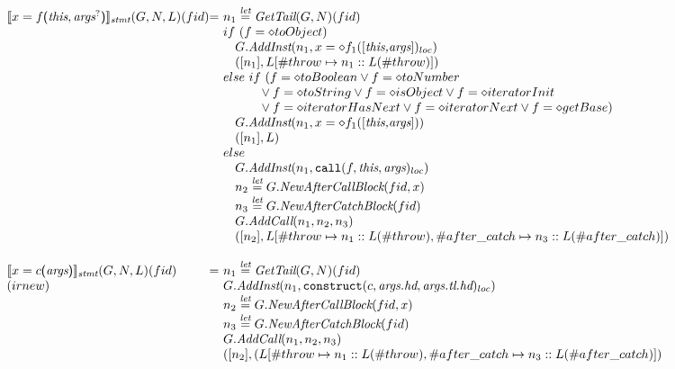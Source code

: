\[
\begin{array}{l@{}l@{~}l}
\transfun{\ircfgcall{x}{f}{\emph{this}, \emph{args}^{?}}}_{\emph{stmt}}(G,N,L)(fid) & = &
	n_1 \letval \GetTail(G,N)(fid)\\
	& & if\ (f = \diamond{toObject}) \\
	& & \phantom{if} G.\emph{AddInst}(n_1,x =\diamond f_1([\emph{this,args}])_{loc})\\
	& & \phantom{if} ([n_1],L[\#throw \mapsto n_{1}::L(\#throw)])\\
	& & else\ if\ (f = \diamond{toBoolean} \vee f = \diamond{toNumber}\\
	& & \phantom{ififif} \vee f = \diamond{toString} \vee f = \diamond{isObject}\vee f = \diamond{iteratorInit}\\
	& & \phantom{ififif} \vee f = \diamond{iteratorHasNext}\vee f = \diamond{iteratorNext}\vee f = \diamond{getBase})\\
	& & \phantom{if} G.\emph{AddInst}(n_1,x =\diamond f_1([\emph{this,args}]))\\
	& & \phantom{if} ([n_1],L)\\
	& & else\\
	& & \phantom{if} G.\emph{AddInst}(n_1,\TT{call}(f,\emph{this},\emph{args})_{loc})\\
	& & \phantom{if} n_2 \letval G.\emph{NewAfterCallBlock}(fid,x)\\
	& & \phantom{if} n_3 \letval G.\emph{NewAfterCatchBlock}(fid)\\
	& & \phantom{if} G.\emph{AddCall}(n_1, n_2, n_3) \\
	& & \phantom{if} ([n_2],L[\# throw \mapsto n_1::L(\# throw),\# after\_catch \mapsto n_3::L(\# after\_catch)])\\
	
	& & \\
	
\transfun{\ircfgnew{x}{c}{\emph{args}}}_{\emph{stmt}}(G,N,L)(fid) & = &
	n_1 \letval \GetTail(G,N)(fid)\\
(irnew)
	& & G.\emph{AddInst}(n_1,\TT{construct}(c,\emph{args.hd},\emph{args.tl.hd})_{loc})\\
	& & n_2 \letval G.\emph{NewAfterCallBlock}(fid,x)\\
	& & n_3 \letval G.\emph{NewAfterCatchBlock}(fid)\\
	& & G.\emph{AddCall}(n_1, n_2, n_3) \\
	& & ([n_2],(L[\# throw \mapsto n_1::L(\# throw),\# after\_catch \mapsto n_3::L(\# after\_catch)])\\
	& & \\
	

\end{array}\]
